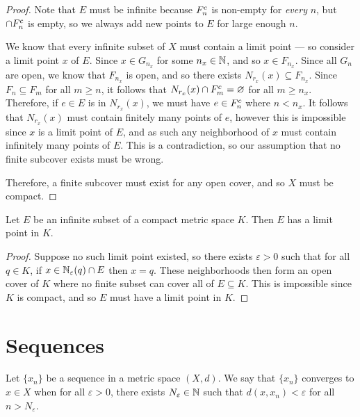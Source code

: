 \begin{proof}
    Note that $E$ must be infinite because $F_n^{c}$ is non-empty for \emph{every} $n$, but $\cap F_n^{c}$ is empty, so we always add new points to $E$ for large enough $n$.

    We know that every infinite subset of $X$ must contain a limit point --- so consider a limit point $x$ of $E$. Since $x \in G_{n_{x}}$ for some $n_x \in \mathbb{N}$, and so $x \in F_{n_x}$. Since all $G_n$ are open, we know that $F_{n_x}$ is open, and so there exists $N_{r_x}(x) \subseteq F_{n_x}$. Since $F_n \subseteq F_m$ for all $m \geq n$, it follows that $N_{r_x}(x) \cap F_{m}^{c} = \varnothing$ for all $m \geq n_x$. Therefore, if $e \in E$ is in $N_{r_x}(x)$, we must have $e \in F_n^{c}$ where $n < n_x$. It follows that $N_{r_x}(x)$ must contain finitely many points of $e$, however this is impossible since $x$ is a limit point of $E$, and as such any neighborhood of $x$ must contain infinitely many points of $E$. This is a contradiction, so our assumption that no finite subcover exists must be wrong.

    Therefore, a finite subcover must exist for any open cover, and so $X$ must be compact.
\end{proof}

\begin{thm}\label{thm:infinite-compact-limit}
    Let $E$ be an infinite subset of a compact metric space $K$. Then $E$ has a limit point in $K$.
\end{thm}

\begin{proof}
    Suppose no such limit point existed, so there exists $\varepsilon > 0$ such that for all $q \in K$, if $x \in \mathbb{N}_{\varepsilon}(q) \cap E$ then $x = q$. These neighborhoods then form an open cover of $K$ where no finite subset can cover all of $E \subseteq K$. This is impossible since $K$ is compact, and so $E$ must have a limit point in $K$.
\end{proof}

\section{Sequences}

\begin{defn}
    Let $\{x_n\}$ be a sequence in a metric space $(X, d)$. We say that $\{x_n\}$ converges to $x \in X$ when for all $\varepsilon > 0$, there exists $N_{\varepsilon} \in \mathbb{N}$ such that $d(x, x_n) < \varepsilon$ for all $n > N_{\varepsilon}$.
\end{defn}

